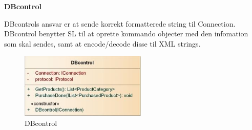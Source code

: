 \textbf{DBcontrol}

DBcontrols ansvar er at sende korrekt formatterede string til Connection. DBcontrol benytter \gls{SL} til at oprette kommando objecter med den infomation som skal sendes, samt at encode/decode disse til XML strings.

\begin{figure}[H]
    \centering
    \includegraphics[width=60mm]{Systemdesign/Frontend/DAL/Pics/DBcontrol}
    \caption{DBcontrol}
    \label{fig:DBcontrol}
\end{figure}

\bigskip